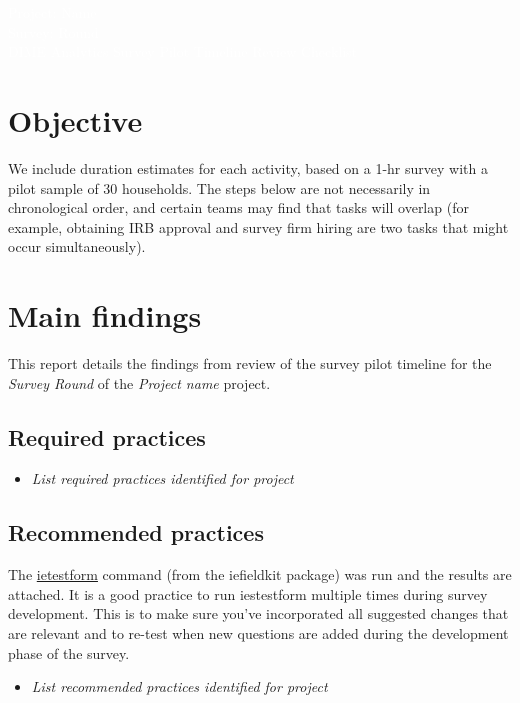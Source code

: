 \documentclass{report}
\newcommand{\titleBox}[1]{
	\begin{tcolorbox}
		[colframe = fontcolor,
		colback = fontcolor,
		sharp corners,
		halign = flush center,
		valign = center,
		height = 0.2\textwidth,
		after skip = 1cm]
		#1
	\end{tcolorbox}
}
\begin{document}
	
	
	\titleBox{
		\textcolor{white}{\Large{Project: Name}} \\
		\textcolor{white}{\Large{Survey: Round}} \\
		\textcolor{white}{\Large{DIME Analytics Survey Pilot Timeline Review Checklist}}
	}


		\section*{Objective}
		We include duration estimates for each activity, based on a 1-hr survey with a pilot sample of 30 households. The steps below are not necessarily in chronological order, and certain teams may find that tasks will overlap (for example, obtaining IRB approval and survey firm hiring are two tasks that might occur simultaneously). 



\section*{Main findings}

This report details the findings from review of the survey pilot timeline for the \textit{Survey Round}  of the \textit{Project name} project.

\subsection*{Required practices}
\begin{itemize}
	\item \textit{List required practices identified for project}
\end{itemize} 
\subsection*{Recommended practices}

The \href{https://dimewiki.worldbank.org/Ietestform}{ietestform} command (from the iefieldkit package) was run and the results are attached. It is a good practice to run iestestform multiple times during survey development. This is to make sure you’ve incorporated all suggested changes that are relevant and to re-test when new questions are added during the development phase of the survey.
\begin{itemize}
	\item \textit{List recommended practices identified for project}
\end{itemize}
\end{document}
